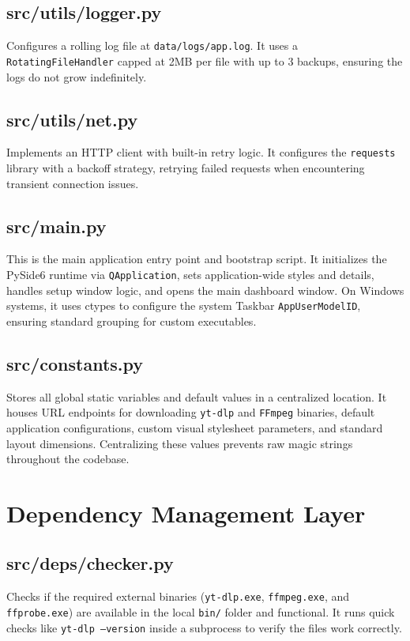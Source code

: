 \documentclass[12pt]{report}
\begin{document}
\subsection{src/utils/logger.py}
Configures a rolling log file at \texttt{data/logs/app.log}. It uses a \texttt{RotatingFileHandler} capped at 2MB per file with up to 3 backups, ensuring the logs do not grow indefinitely.

\subsection{src/utils/net.py}
Implements an HTTP client with built-in retry logic. It configures the \texttt{requests} library with a backoff strategy, retrying failed requests when encountering transient connection issues.

\subsection{src/main.py}
This is the main application entry point and bootstrap script. It initializes the PySide6 runtime via \texttt{QApplication}, sets application-wide styles and details, handles setup window logic, and opens the main dashboard window. On Windows systems, it uses ctypes to configure the system Taskbar \texttt{AppUserModelID}, ensuring standard grouping for custom executables.

\subsection{src/constants.py}
Stores all global static variables and default values in a centralized location. It houses URL endpoints for downloading \texttt{yt-dlp} and \texttt{FFmpeg} binaries, default application configurations, custom visual stylesheet parameters, and standard layout dimensions. Centralizing these values prevents raw magic strings throughout the codebase.

\section{Dependency Management Layer}

\subsection{src/deps/checker.py}
Checks if the required external binaries (\texttt{yt-dlp.exe}, \texttt{ffmpeg.exe}, and \texttt{ffprobe.exe}) are available in the local \texttt{bin/} folder and functional. It runs quick checks like \texttt{yt-dlp --version} inside a subprocess to verify the files work correctly.
\end{document}
